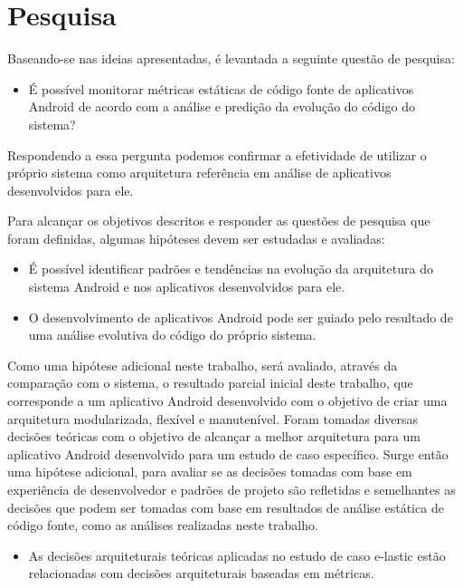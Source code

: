 \section{Pesquisa}

Baseando-se nas ideias apresentadas, é levantada a seguinte questão de pesquisa:

\begin{itemize}
\item É possível monitorar métricas estáticas de código fonte de aplicativos Android de acordo com a análise e predição da evolução do código do sistema?
\end{itemize}

Respondendo a essa pergunta podemos confirmar a efetividade de utilizar o próprio sistema como arquitetura referência em análise de aplicativos desenvolvidos para ele.

Para alcançar os objetivos descritos e responder as questões de pesquisa que foram definidas, algumas hipóteses devem ser estudadas e avaliadas:

\begin{itemize}
\item É possível identificar padrões e tendências na evolução da arquitetura do sistema Android e nos aplicativos desenvolvidos para ele.
\item O desenvolvimento de aplicativos Android pode ser guiado pelo resultado de uma análise evolutiva do código do próprio sistema.
\end{itemize}

Como uma hipótese adicional neste trabalho, será avaliado, através da comparação com o sistema, o resultado parcial inicial deste trabalho, que corresponde a um aplicativo Android desenvolvido com o objetivo de criar uma arquitetura modularizada, flexível e manutenível. Foram tomadas diversas decisões teóricas com o objetivo de alcançar a melhor arquitetura para um aplicativo Android desenvolvido para um estudo de caso específico. Surge então uma hipótese adicional, para avaliar se as decisões tomadas com base em experiência de desenvolvedor e padrões de projeto são refletidas e semelhantes as decisões que podem ser tomadas com base em resultados de análise estática de código fonte, como as análises realizadas neste trabalho.

\begin{itemize}
\item As decisões arquiteturais teóricas aplicadas no estudo de caso e-lastic estão relacionadas com decisões arquiteturais baseadas em métricas.
\end{itemize}

